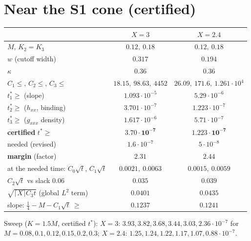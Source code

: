 \documentclass[11pt]{article}
\begin{document}
\section{Near the S1 cone (certified)}
\begin{center}\small\begin{tabular}{lcc}\toprule
 & $X=3$ & $X=2.4$\\\midrule
$M$, $K_2=K_3$ & $0.12,\ 0.18$ & $0.12,\ 0.18$\\
$w$ (cutoff width) & $0.317$ & $0.194$\\
$\kappa$ & $0.36$ & $0.36$\\
$C_1\le$, $C_2\le$, $C_3\le$ & $18.15,\ 98.63,\ 4452$ & $26.09,\ 171.6,\ 1.261\cdot10^4$\\
$t_1^*\ge$ (slope) & $1.093\cdot10^{-5}$ & $5.29\cdot10^{-6}$\\
$t_2^*\ge$ ($h_{xx}$, binding) & $3.701\cdot10^{-7}$ & $1.223\cdot10^{-7}$\\
$t_3^*\ge$ ($g_{xxx}$ density) & $1.617\cdot10^{-6}$ & $5.71\cdot10^{-7}$\\
\textbf{certified} $t^*\ge$ & $\mathbf{3.70\cdot10^{-7}}$ & $\mathbf{1.223\cdot10^{-7}}$\\
needed (revised) & $1.6\cdot10^{-7}$ & $5\cdot10^{-8}$\\
\textbf{margin} (factor) & $\mathbf{2.31}$ & $\mathbf{2.44}$\\
at the needed time: $C_0\sqrt t$, $C_1\sqrt t$ & $0.0021,\ 0.0063$ & $0.0015,\ 0.0059$\\
 $C_2\sqrt t$ vs slack $0.06$ & $0.035$ & $0.039$\\
 $\sqrt{\lceil X\rceil C_3t}$ (global $L^2$ term) & $0.0401$ & $0.0435$\\
slope: $\tfrac14-M-C_1\sqrt t\ \ge$ & $0.1237$ & $0.1241$\\\bottomrule
\end{tabular}\end{center}
Sweep ($K=1.5M$, certified $t^*$): $X=3$: $3.93,3.82,3.68,3.44,3.03,2.36\cdot10^{-7}$ for $M=0.08,0.1,0.12,0.15,0.2,0.3$; $X=2.4$: $1.25,1.24,1.22,1.17,1.07,0.88\cdot10^{-7}$.
\end{document}
